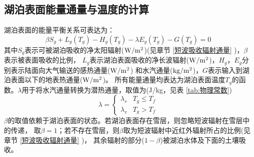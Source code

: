 \subsection{湖泊表面能量通量与温度的计算}
湖泊表面的能量平衡关系可表达为：
\begin{equation}
\beta S_{g}+L_{g}\left(T_{g}\right)-H_{g}\left(T_{g}\right)-\lambda E_{g}\left(T_{g}\right)-G\left(T_{g}\right)=0
\end{equation}
其中$S_g$表示可被湖泊吸收的净太阳辐射($\rm W/m^2$)(见章节 \ref{短波吸收辐射通量} )，$\beta$表示被表面吸收的比例，
$L_g$表示湖泊表面吸收的净长波辐射($\rm W/m^2$)，$H_g$，$E_g$分别表示陆面向大气输送的感热通量($\rm W/m^2$)
和水汽通量($\rm kg/m^2$)，$G$表示输入到湖泊表面以下的地表热通量($\rm W/m^2$)。
所有能量通量均表达为湖泊表面温度$T_g$的函数。$\lambda$用于将水汽通量转换为潜热通量，取值为(J/kg，见表 \ref{tab:物理常数})
\begin{equation}
\lambda=\left\{\begin{array}{ll}\lambda_{s} & T_{g} \leq T_{f} \\ \lambda_{v} & T_{g}>T_{f}\end{array}\right.
\end{equation}
$\beta$的取值依赖于湖泊表面的状态。若湖泊表面存在雪层，则忽略短波辐射在雪层中的传递，
取$\beta=1$；若不存在雪层，则$\beta$取为短波辐射中近红外辐射所占的比例(见章节 \ref{短波吸收辐射通量} )，
其余辐射的部分($1-\beta$)被湖泊水体及下面的土壤吸收。


